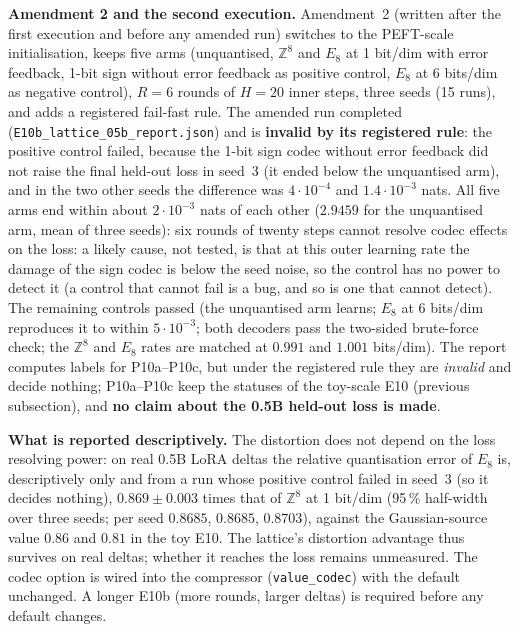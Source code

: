 \documentclass[11pt,a4paper]{article}
\begin{document}
\textbf{Amendment 2 and the second execution.} Amendment~2 (written after the first execution and before any amended run) switches to the PEFT-scale initialisation, keeps five arms (unquantised, $\mathbb{Z}^8$ and $E_8$ at 1 bit/dim with error feedback, 1-bit sign without error feedback as positive control, $E_8$ at 6 bits/dim as negative control), $R=6$ rounds of $H=20$ inner steps, three seeds (15 runs), and adds a registered fail-fast rule. The amended run completed (\texttt{E10b\_lattice\_05b\_report.json}) and is \textbf{invalid by its registered rule}: the positive control failed, because the 1-bit sign codec without error feedback did not raise the final held-out loss in seed~3 (it ended below the unquantised arm), and in the two other seeds the difference was $4\cdot10^{-4}$ and $1.4\cdot10^{-3}$ nats. All five arms end within about $2\cdot10^{-3}$ nats of each other ($2.9459$ for the unquantised arm, mean of three seeds): six rounds of twenty steps cannot resolve codec effects on the loss: a likely cause, not tested, is that at this outer learning rate the damage of the sign codec is below the seed noise, so the control has no power to detect it (a control that cannot fail is a bug, and so is one that cannot detect). The remaining controls passed (the unquantised arm learns; $E_8$ at 6 bits/dim reproduces it to within $5\cdot10^{-3}$; both decoders pass the two-sided brute-force check; the $\mathbb{Z}^8$ and $E_8$ rates are matched at $0.991$ and $1.001$ bits/dim). The report computes labels for P10a--P10c, but under the registered rule they are \emph{invalid} and decide nothing; P10a--P10c keep the statuses of the toy-scale E10 (previous subsection), and \textbf{no claim about the 0.5B held-out loss is made}.

\textbf{What is reported descriptively.} The distortion does not depend on the loss resolving power: on real 0.5B LoRA deltas the relative quantisation error of $E_8$ is, descriptively only and from a run whose positive control failed in seed~3 (so it decides nothing), $\mathbf{0.869} \pm 0.003$ times that of $\mathbb{Z}^8$ at 1 bit/dim (95\,\% half-width over three seeds; per seed $0.8685$, $0.8685$, $0.8703$), against the Gaussian-source value $0.86$ and $0.81$ in the toy E10. The lattice's distortion advantage thus survives on real deltas; whether it reaches the loss remains unmeasured. The codec option is wired into the compressor (\texttt{value\_codec}) with the default unchanged. A longer E10b (more rounds, larger deltas) is required before any default changes.
\end{document}
